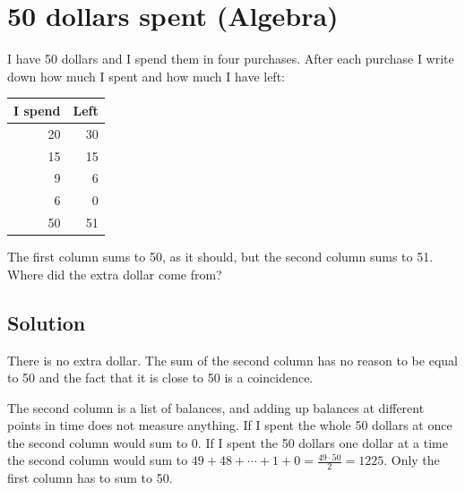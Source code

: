 \section {50 dollars spent (Algebra)}

I have 50 dollars and I spend them in four purchases.
After each purchase I write down how much I spent and how much I have left:

\begin{center}
\begin{tabular}{r r}
I spend & Left \\
\hline
20 & 30 \\
15 & 15 \\
9 & 6 \\
6 & 0 \\
\hline
50 & 51 \\
\end{tabular}
\end{center}

The first column sums to 50, as it should, but the second column sums to 51.
Where did the extra dollar come from?

\subsection{Solution}

There is no extra dollar. The sum of the second column has no reason to be equal to 50 and the fact that it is close to 50 is a coincidence.

The second column is a list of balances, and adding up balances at different points in time does not measure anything.
If I spent the whole 50 dollars at once the second column would sum to $0$.
If I spent the 50 dollars one dollar at a time the second column would sum to $49+48+\cdots+1+0 = \frac{49 \cdot 50}{2} = 1225$.
Only the first column has to sum to 50.
